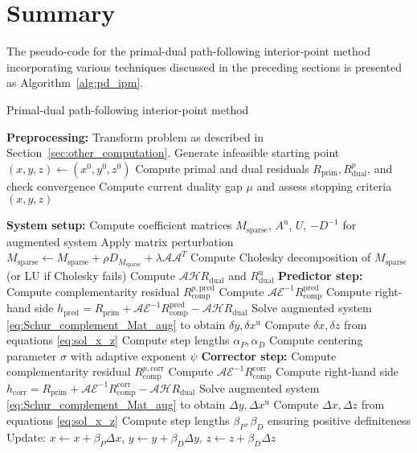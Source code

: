 \section{Summary}
The pseudo-code for the primal-dual path-following interior-point method incorporating various techniques discussed in the preceding sections is presented as Algorithm~\ref{alg:pd_ipm}. 
\begin{algorithm}
\caption{Primal-dual path-following interior-point method}
\label{alg:pd_ipm}
\begin{algorithmic}[1]
\STATE \textbf{Preprocessing:} Transform problem as described in Section~\ref{sec:other_computation}. 
Generate infeasible starting point $(x,y,z) \leftarrow (x^0, y^0, z^0)$
    \STATE Compute primal and dual residuals $R_{\text{prim}}, R_{\text{dual}}^p$, and check convergence
    \STATE Compute current duality gap $\mu$ and assess stopping criteria
        \RETURN $(x, y, z)$
    \ENDIF
    
    \STATE \textbf{System setup:}
    \STATE Compute coefficient matrices $M_{\text{sparse}}$, $A^{\text{u}}$, $U$, $-D^{-1}$ for augmented system
    \STATE Apply matrix perturbation $M_{\text{sparse}} \leftarrow M_{\text{sparse}} + \rho D_{M_{\text{sparse}}} + \lambda \mathcal{A}\mathcal{A}^T$
    \STATE Compute Cholesky decomposition of $M_{\text{sparse}}$ (or LU if Cholesky fails)
    \STATE Compute $\mathcal{A}\mathcal{H}R_{\text{dual}}$ and $R^{\text{u}}_{\text{dual}}$
    \STATE 
    \STATE \textbf{Predictor step:}
    \STATE Compute complementarity residual $R_{\text{comp}}^{p,\text{pred}}$
    \STATE Compute $\mathcal{A}\mathcal{E}^{-1}R_{\text{comp}}^{\text{pred}}$ 
    \STATE Compute right-hand side $h_{\text{pred}} = R_{\text{prim}} + \mathcal{A}\mathcal{E}^{-1}R_{\text{comp}}^{\text{pred}} - \mathcal{A}\mathcal{H}R_{\text{dual}}$
    \STATE Solve augmented system \eqref{eq:Schur_complement_Mat_aug} to obtain $\delta y, \delta x^{\text{u}}$
    \STATE Compute $\delta x, \delta z$ from equations \eqref{eq:sol_x_z}
    \STATE Compute step lengths $\alpha_{P}, \alpha_{D}$
    \STATE Compute centering parameter $\sigma$ with adaptive exponent $\psi$
    \STATE
    \STATE \textbf{Corrector step:}
    \STATE Compute complementarity residual $R_{\text{comp}}^{p,\text{corr}}$
    \STATE Compute $\mathcal{A}\mathcal{E}^{-1}R_{\text{comp}}^{\text{corr}}$
    \STATE Compute right-hand side $h_{\text{corr}} = R_{\text{prim}} + \mathcal{A}\mathcal{E}^{-1}R_{\text{comp}}^{\text{corr}} - \mathcal{A}\mathcal{H}R_{\text{dual}}$
    \STATE Solve augmented system \eqref{eq:Schur_complement_Mat_aug} to obtain $\Delta y, \Delta x^{\text{u}}$
    \STATE Compute $\Delta x, \Delta z$ from equations \eqref{eq:sol_x_z}
    \STATE Compute step lengths $\beta_P, \beta_D$ ensuring positive definiteness
    \STATE Update: $x \leftarrow x + \beta_P \Delta x$, $y \leftarrow y + \beta_D \Delta y$, $z \leftarrow z + \beta_D \Delta z$


\end{algorithmic}
\end{algorithm}
